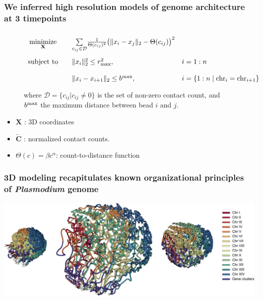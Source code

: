 \documentclass[xcolor=dvipsnames]{beamer}
\begin{document}
\begin{frame}
\frametitle{We inferred high resolution models of genome architecture at 3
timepoints}
\begin{figure}
\begin{equation*}
\renewcommand{\arraystretch}{2}
\begin{array}{ccll}
\underset{\mathbf{X}}{\text{minimize}} & &
\underset{c_{ij} \in \mathcal{D}}{\sum}
\frac{1}{\Theta(c_{ij})^2}\big(\|x_i - x_j\|_2 - \Theta(c_{ij})\big)^2 &\\
\text{subject to}
& & \|x_i\|_2^2 \leq r_{\rm max}^2, \quad
& i = 1:n\\
& & \|x_i - x_{i+1}\|_2 \leq b^{\rm max} , \quad
& i = \{1:n \;|\; {\rm chr}_i = {\rm chr}_{i+1}\}\\
\end{array}
\end{equation*}
where  $\mathcal{D} = \{ c_{ij} | c_{ij} \neq 0\}$ is
the set of non-zero contact count, and $b^{\rm max}$ the maximum distance
between bead $i$ and $j$.
\end{figure}

\vspace{2em}
{\tiny
\begin{multicols}{2}
\begin{itemize}[label={$\bullet$}]
\item $\mathbf{X}$ : 3D coordinates
\item $\mathbf{\tilde{C}}$ : normalized contact counts.
\item $\Theta(c) = \beta c^\alpha$: count-to-distance function
\end{itemize}
\end{multicols}
}


\end{frame}

\begin{frame}
\frametitle{3D modeling recapitulates known organizational
principles of {\em Plasmodium} genome}

\begin{center}
\includegraphics[scale=0.22]{figures/3D_var_genes.png}
\end{center}
\end{frame}
\end{document}
